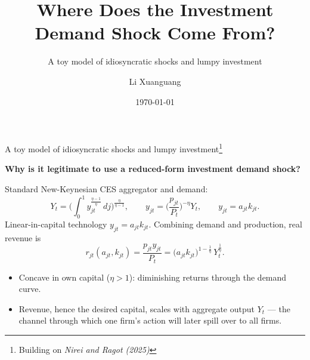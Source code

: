 \documentclass[9pt]{beamer}
\title{Where Does the Investment Demand Shock Come From?}
\subtitle{A toy model of idiosyncratic shocks and lumpy investment}
\author{Li Xuanguang}
\date{\today}
\begin{document}
\begin{frame}
	\titlepage
	\vspace{-1em}
\end{frame}

\begin{frame}{A toy model of idiosyncratic shocks and lumpy investment\footnote{Building on \textit{Nirei and Ragot (2025)}}}
	
	\textbf{Why is it legitimate to use a reduced-form investment demand shock?}
	\vspace{1em}

	Standard New-Keynesian CES aggregator and demand:
	\[
		Y_t=\Big(\int_0^1 y_{jt}^{\frac{\eta-1}{\eta}}\,dj\Big)^{\frac{\eta}{\eta-1}},
		\qquad
		y_{jt}=\Big(\frac{p_{jt}}{P_t}\Big)^{-\eta}Y_t,
		\qquad
		y_{jt}=a_{jt}k_{jt}.
	\]
	Linear-in-capital technology $y_{jt}=a_{jt}k_{jt}$. Combining demand and production, real revenue is
	\[
		r_{jt}(a_{jt},k_{jt})=\frac{p_{jt}y_{jt}}{P_t}
		=\big(a_{jt}k_{jt}\big)^{1-\frac1\eta}\,Y_t^{\frac1\eta}.
	\]
	\begin{itemize}\small
		\item Concave in own capital ($\eta>1$): diminishing returns through the demand curve.
		\item Revenue, hence the desired capital, scales with aggregate output $Y_t$ — the channel through which one firm's action will later spill over to all firms.
	\end{itemize}
\end{frame}
\end{document}
